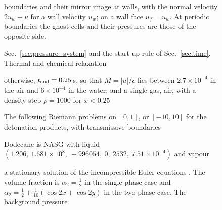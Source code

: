 \begin{figure}[p]
{%
boundaries and their mirror image at walls, with the normal velocity $2u_w-u$ for a wall velocity $u_w$; on a wall face $u_f=u_w$. At periodic boundaries the ghost cells and their pressures are those of the opposite side.

Sec.~\ref{sec:pressure_system} and the start-up rule of Sec.~\ref{sec:time}. Thermal and chemical relaxation

otherwise, $t_{\rm end}=0.25$\,s, so that $M=|u|/c$ lies between $2.7\times10^{-4}$ in the air and $6\times10^{-4}$ in the water; and a single gas, air, with a density step $\rho=1000$ for $x<0.25$

The following Riemann problems on $[0,1]$, or $[-10,10]$ for the detonation products, with transmissive boundaries

Dodecane is NASG with liquid $(1.206,\allowbreak\ 1.681\times10^8,\allowbreak\ -996054,\allowbreak\ 0,\allowbreak\ 2532,\allowbreak\ 7.51\times10^{-4})$ and vapour

a stationary solution of the incompressible Euler equations \cite{TaylorGreen1937}. The volume fraction is $\alpha_2=\tfrac12$ in the single-phase
case and $\alpha_2=\tfrac12+\tfrac1{10}(\cos2x+\cos2y)$ in the two-phase case. The background pressure

}
\end{figure}
